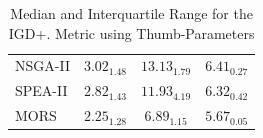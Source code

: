 \begin{table}[!htc]
{\begin{tabular}{@{}lccccccccc@{}}
NSGA-II  & \multicolumn{3}{c}{$3.02_{1.48}$}                   & \multicolumn{3}{c}{$13.13_{1.79}$}                   & \multicolumn{3}{c}{$6.41_{0.27}$}                   \\
SPEA-II  & \multicolumn{3}{c}{$2.82_{1.43}$}                   & \multicolumn{3}{c}{$11.93_{4.19}$}                   & \multicolumn{3}{c}{$6.32_{0.42}$}                   \\
MORS     & \multicolumn{3}{c}{\cellcolor{gray95}$2.25_{1.28}$} & \multicolumn{3}{c}{\cellcolor{gray25}$6.89_{1.15}$}  & \multicolumn{3}{c}{\cellcolor{gray95}$5.67_{0.05}$} \\ \bottomrule
\end{tabular}%
}
\caption{Median and Interquartile Range for the IGD+. Metric using Thumb-Parameters}
\label{tab:igd+_thumb}
\end{table}


